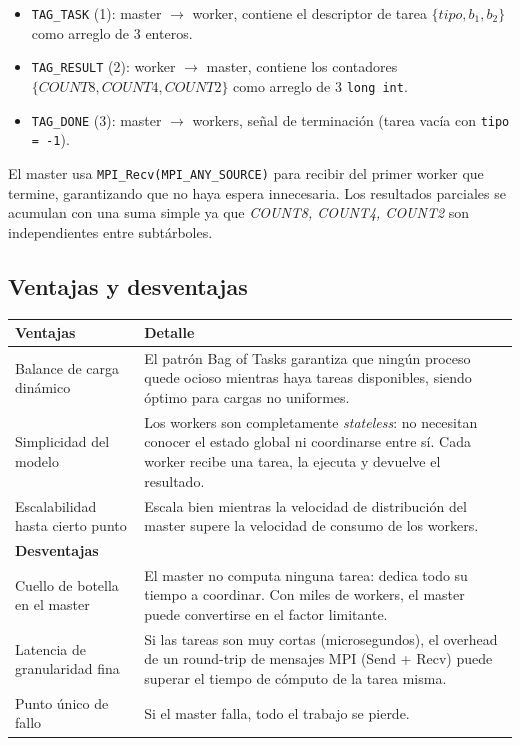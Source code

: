 \documentclass[12pt,a4paper]{article}
\begin{document}
\begin{itemize}
  \item \texttt{TAG\_TASK} (1): master $\to$ worker, contiene el descriptor de tarea
    $\{tipo, b_1, b_2\}$ como arreglo de 3 enteros.
  \item \texttt{TAG\_RESULT} (2): worker $\to$ master, contiene los contadores
    $\{COUNT8, COUNT4, COUNT2\}$ como arreglo de 3 \texttt{long int}.
  \item \texttt{TAG\_DONE} (3): master $\to$ workers, señal de terminación
    (tarea vacía con \texttt{tipo = -1}).
\end{itemize}

El master usa \texttt{MPI\_Recv(MPI\_ANY\_SOURCE)} para recibir del primer worker
que termine, garantizando que no haya espera innecesaria. Los resultados parciales
se acumulan con una suma simple ya que \textit{COUNT8, COUNT4, COUNT2} son
independientes entre subtárboles.

\subsection{Ventajas y desventajas}

\begin{longtable}{L{4cm} L{10cm}}
\toprule
\textbf{Ventajas} & \textbf{Detalle} \\
\midrule
\endhead
Balance de carga dinámico & El patrón Bag of Tasks garantiza que ningún proceso
  quede ocioso mientras haya tareas disponibles, siendo óptimo para cargas
  no uniformes. \\[4pt]
Simplicidad del modelo & Los workers son completamente \textit{stateless}: no
  necesitan conocer el estado global ni coordinarse entre sí. Cada worker
  recibe una tarea, la ejecuta y devuelve el resultado. \\[4pt]
Escalabilidad hasta cierto punto & Escala bien mientras la velocidad de
  distribución del master supere la velocidad de consumo de los workers. \\
\midrule
\textbf{Desventajas} & \\
\midrule
Cuello de botella en el master & El master no computa ninguna tarea: dedica
  todo su tiempo a coordinar. Con miles de workers, el master puede convertirse
  en el factor limitante. \\[4pt]
Latencia de granularidad fina & Si las tareas son muy cortas (microsegundos),
  el overhead de un round-trip de mensajes MPI (Send + Recv) puede superar el
  tiempo de cómputo de la tarea misma. \\[4pt]
Punto único de fallo & Si el master falla, todo el trabajo se pierde. \\
\bottomrule
\end{longtable}
\end{document}
